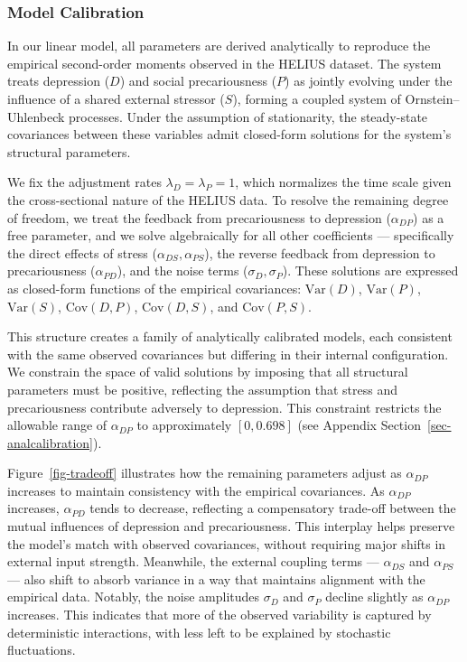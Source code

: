 \documentclass[
]{article}
\begin{document}
\subsubsection{Model Calibration}\label{sec-calibration}

In our linear model, all parameters are derived analytically to
reproduce the empirical second-order moments observed in the HELIUS
dataset. The system treats depression (\(D\)) and social precariousness
(\(P\)) as jointly evolving under the influence of a shared external
stressor (\(S\)), forming a coupled system of Ornstein--Uhlenbeck
processes. Under the assumption of stationarity, the steady-state
covariances between these variables admit closed-form solutions for the
system's structural parameters.

We fix the adjustment rates \(\lambda_D = \lambda_P = 1\), which
normalizes the time scale given the cross-sectional nature of the HELIUS
data. To resolve the remaining degree of freedom, we treat the feedback
from precariousness to depression (\(\alpha_{DP}\)) as a free parameter,
and we solve algebraically for all other coefficients --- specifically
the direct effects of stress (\(\alpha_{DS}, \alpha_{PS}\)), the reverse
feedback from depression to precariousness (\(\alpha_{PD}\)), and the
noise terms (\(\sigma_D, \sigma_P\)). These solutions are expressed as
closed-form functions of the empirical covariances: \(\mathrm{Var}(D)\),
\(\mathrm{Var}(P)\), \(\mathrm{Var}(S)\), \(\mathrm{Cov}(D, P)\),
\(\mathrm{Cov}(D, S)\), and \(\mathrm{Cov}(P, S)\).

This structure creates a family of analytically calibrated models, each
consistent with the same observed covariances but differing in their
internal configuration. We constrain the space of valid solutions by
imposing that all structural parameters must be positive, reflecting the
assumption that stress and precariousness contribute adversely to
depression. This constraint restricts the allowable range of
\(\alpha_{DP}\) to approximately \([0, 0.698]\) (see Appendix
Section~\ref{sec-analcalibration}).

Figure~\ref{fig-tradeoff} illustrates how the remaining parameters
adjust as \(\alpha_{DP}\) increases to maintain consistency with the
empirical covariances. As \(\alpha_{DP}\) increases, \(\alpha_{PD}\)
tends to decrease, reflecting a compensatory trade-off between the
mutual influences of depression and precariousness. This interplay helps
preserve the model's match with observed covariances, without requiring
major shifts in external input strength. Meanwhile, the external
coupling terms --- \(\alpha_{DS}\) and \(\alpha_{PS}\) --- also shift to
absorb variance in a way that maintains alignment with the empirical
data. Notably, the noise amplitudes \(\sigma_D\) and \(\sigma_P\)
decline slightly as \(\alpha_{DP}\) increases. This indicates that more
of the observed variability is captured by deterministic interactions,
with less left to be explained by stochastic fluctuations.
\end{document}
